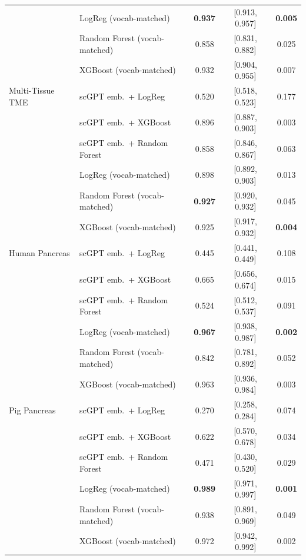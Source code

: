 \documentclass[11pt,a4paper]{article}
\newcommand{\multirow}[3]{#3}
\begin{document}
\begin{table}[H]
\begin{tabular}{llccc}
 & LogReg (vocab-matched)              & \textbf{0.937} & [0.913, 0.957] & \textbf{0.005} \\
 & Random Forest (vocab-matched)       & 0.858 & [0.831, 0.882] & 0.025 \\
 & XGBoost (vocab-matched)             & 0.932 & [0.904, 0.955] & 0.007 \\
\midrule
\multirow{6}{*}{Multi-Tissue TME}
 & scGPT emb.\ + LogReg                & 0.520 & [0.518, 0.523] & 0.177 \\
 & scGPT emb.\ + XGBoost               & 0.896 & [0.887, 0.903] & 0.003 \\
 & scGPT emb.\ + Random Forest         & 0.858 & [0.846, 0.867] & 0.063 \\
 & LogReg (vocab-matched)              & 0.898 & [0.892, 0.903] & 0.013 \\
 & Random Forest (vocab-matched)       & \textbf{0.927} & [0.920, 0.932] & 0.045 \\
 & XGBoost (vocab-matched)             & 0.925 & [0.917, 0.932] & \textbf{0.004} \\
\midrule
\multirow{6}{*}{Human Pancreas}
 & scGPT emb.\ + LogReg                & 0.445 & [0.441, 0.449] & 0.108 \\
 & scGPT emb.\ + XGBoost               & 0.665 & [0.656, 0.674] & 0.015 \\
 & scGPT emb.\ + Random Forest         & 0.524 & [0.512, 0.537] & 0.091 \\
 & LogReg (vocab-matched)              & \textbf{0.967} & [0.938, 0.987] & \textbf{0.002} \\
 & Random Forest (vocab-matched)       & 0.842 & [0.781, 0.892] & 0.052 \\
 & XGBoost (vocab-matched)             & 0.963 & [0.936, 0.984] & 0.003 \\
\midrule
\multirow{6}{*}{Pig Pancreas}
 & scGPT emb.\ + LogReg                & 0.270 & [0.258, 0.284] & 0.074 \\
 & scGPT emb.\ + XGBoost               & 0.622 & [0.570, 0.678] & 0.034 \\
 & scGPT emb.\ + Random Forest         & 0.471 & [0.430, 0.520] & 0.029 \\
 & LogReg (vocab-matched)              & \textbf{0.989} & [0.971, 0.997] & \textbf{0.001} \\
 & Random Forest (vocab-matched)       & 0.938 & [0.891, 0.969] & 0.049 \\
 & XGBoost (vocab-matched)             & 0.972 & [0.942, 0.992] & 0.002 \\

\end{tabular}
\end{table}
\end{document}
